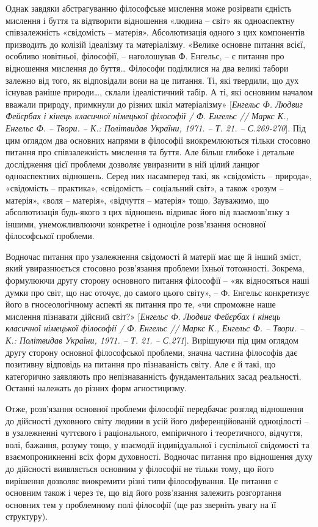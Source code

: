 Однак завдяки абстрагуванню філософське мислення може розірвати
єдність мислення і буття та відтворити відношення «людина – світ» як
одноаспектну співзалежність «свідомість – матерія». Абсолютизація одного з
цих компонентів призводить до колізій ідеалізму та матеріалізму. «Велике
основне питання всієї, особливо новітньої, філософії, – наголошував Ф.
Енгельс, – є питання про відношення мислення до буття… Філософи
поділилися на два великі табори залежно від того, як відповідали вони на це
питання. Ті, які твердили, що дух існував раніше природи…, склали
ідеалістичний табір. А ті, які основним началом вважали природу, примкнули
до різних шкіл матеріалізму» [\textit{Енгельс Ф. Людвиг Фейєрбах і кінець класичної
німецької філософії / Ф. Енгельс // Маркс К., Енгельс Ф. – Твори. – К.: 
Політвидав України, 1971. – Т. 21. – С.269-270}]. Під цим оглядом два основних
напрями в філософії виокремлюються тільки стосовно питання про
співзалежність мислення та буття. Але більш глибоке і детальне дослідження
цієї проблеми дозволяє увиразнити в ній цілий ланцюг одноаспектних
відношень. Серед них насамперед такі, як «свідомість – природа», «свідомість –
практика», «свідомість – соціальний світ», а також «розум – матерія», «воля –
матерія», «відчуття – матерія» тощо. Зауважимо, що абсолютизація будь-якого
з цих відношень відриває його від взаємозв’язку з іншими, унеможливлюючи
конкретне і одноціле розв’язання основної філософської проблеми.

Водночас питання про узалежнення свідомості й матерії має ще й інший
зміст, який увиразнюється стосовно розв’язання проблеми їхньої тотожності.
Зокрема, формулюючи другу сторону основного питання філософії – «як
відносяться наші думки про світ, що нас оточує, до самого цього світу», – Ф.
Енгельс конкретизує його в гносеологічному аспекті як питання про те, «чи
спроможне наше мислення пізнавати дійсний світ?» [\textit{Енгельс Ф. Людвиг
Фейєрбах і кінець класичної німецької філософії / Ф. Енгельс // Маркс К.,
Енгельс Ф. – Твори. – К.: Політвидав України, 1971. – Т. 21. – С.271}].
Вирішуючи під цим оглядом другу сторону основної філософської проблеми,
значна частина філософів дає позитивну відповідь на питання про пізнаваність
світу. Але є й такі, що категорично заявляють про непізнаванність
фундаментальних засад реальності. Останні належать до різних форм
агностицизму.

Отже, розв’язання основної проблеми філософії передбачає розгляд
відношення до дійсності духовного світу людини в усій його диференційованій
одноцілості – в узалежненні чуттєвого і раціонального, емпіричного і
теоретичного, відчуття, волі, бажання, розуму тощо, у взаємодії індивідуальної
і суспільної свідомості та взаємопроникненні всіх форм духовності. Водночас
питання про відношення духу до дійсності виявляється основним у філософії не
тільки тому, що його вирішення дозволяє виокремити різні типи
філософування. Це питання є основним також і через те, що від його
розв’язання залежить розгортання основних тем у проблемному полі філософії
(ще раз зверніть увагу на її структуру).

